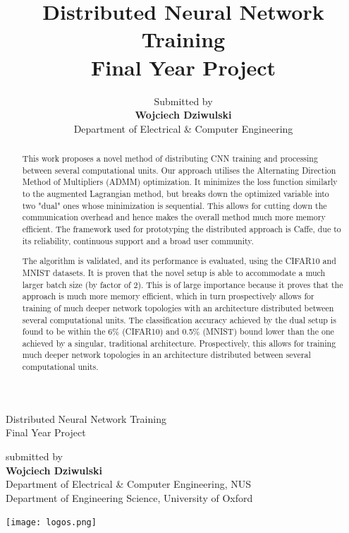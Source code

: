 \documentclass[a4paper, 12pt]{article}
\title{Distributed Neural Network Training \\ \large Final Year Project}
\author{Submitted by \\ \textbf{Wojciech Dziwulski} \\ Department of Electrical \& Computer Engineering}
\date{}
\numberwithin{equation}{section}
\begin{document}
	\clearpage


	\begin{titlepage}
		\centering
		\vfill
		{\Huge Distributed Neural Network Training}\\
		Final Year Project

		\vskip5cm

		submitted by\\
		{\large\textbf{Wojciech Dziwulski}}\\
		Department of Electrical \& Computer Engineering, NUS \\
		Department of Engineering Science, University of Oxford

		\vfill
		\texttt{[image: logos.png]}
		\vfill
		\vfill
	\end{titlepage}


	\thispagestyle{empty}

	\newpage

	\begin{abstract}

		This work proposes a novel method of distributing CNN training and processing between several computational units. Our approach utilises the Alternating Direction Method of Multipliers (ADMM) optimization. It minimizes the loss function similarly to the augmented Lagrangian method, but breaks down the optimized variable into two "dual" ones whose minimization is sequential. This allows for cutting down the communication overhead and hence makes the overall method much more memory efficient. The framework used for prototyping the distributed approach is Caffe, due to its reliability, continuous support and a broad user community.

		The algorithm is validated, and its performance is evaluated, using the CIFAR10 and MNIST datasets. 
		It is proven that the novel setup is able to accommodate a much larger batch size (by factor of 2). This is of large importance because it proves that the approach is much more memory efficient, which in turn prospectively allows for training of much deeper network topologies with an architecture distributed between several computational units. The classification accuracy achieved by the dual setup is found to be within the 6\% (CIFAR10) and 0.5\% (MNIST) bound lower than the one achieved by a singular, traditional architecture. Prospectively, this allows for training much deeper network topologies in an architecture distributed between several computational units.

	\end{abstract}
\end{document}
